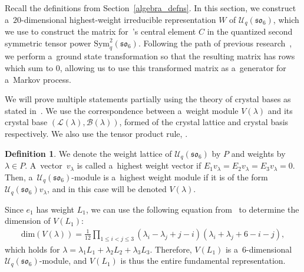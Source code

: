 \documentclass[pdftex]{sigma}
\numberwithin{equation}{section}
\theoremstyle{definition}
\newtheorem{Definition}[Theorem]{Definition}
\begin{document}
Recall the definitions from Section~\ref{algebra_defns}. In this section, we construct a~$20$-dimensional highest-weight irreducible representation $W$ of $\mathcal{U}_q(\mathfrak{so}_6)$, which we use to construct the matrix for~\cite{kuan2020interactingparticlesystemstype}'s central element $C$ in the quantized second symmetric tensor power $\mathrm{Sym}^2_q(\mathfrak{so}_6)$. Following the path of previous research~\cite{kuan2019stochastic}, we perform a~ground state transformation so that the resulting matrix has rows which sum to $0$, allowing us to use this transformed matrix as a~generator for a~Markov process.


We will prove multiple statements partially using the theory of crystal bases as stated in~\cite{QuantumBases}. We use the correspondence between a~weight module $V(\lambda)$ and its crystal base $(\mathcal{L}(\lambda), \mathcal{B}(\lambda))$, formed of the crystal lattice and crystal basis respectively. We also use the tensor product rule, \cite[Theorem~4.4.1 on page~83 ]{QuantumBases}.

\begin{Definition}
 We denote the weight lattice of $\mathcal{U}_q(\mathfrak{so}_6)$ by $P$ and weights by $\lambda \in P$. A~vector~$v_\lambda$ is called a~highest weight vector if $E_1v_\lambda = E_2 v_\lambda = E_3v_\lambda = 0$. Then, a~$\mathcal{U}_q(\mathfrak{so}_6)$-module is a~highest weight module if it is of the form $\mathcal{U}_q(\mathfrak{so}_6)v_\lambda$, and in this case will be denoted $V(\lambda)$.
\end{Definition}
Since $e_1$ has weight $L_1$, we can use the following equation from~\cite{FultonHarris} to determine the dimension of $V(L_1)$:
\begin{align}
\label{dimensionformula}
\text{dim}(V(\lambda)) = \frac{1}{12}\prod_{1 \leq i < j \leq 3} (\lambda_i - \lambda_j +j-i)(\lambda_i+\lambda_j+6-i-j),
\end{align}
which holds for $\lambda = \lambda_1L_1 + \lambda_2L_2 + \lambda_3L_3$. Therefore, $V(L_1)$ is a~6-dimensional $\mathcal{U}_q(\mathfrak{so}_6)$-module, and $V(L_1)$ is thus the entire fundamental representation.
\end{document}

